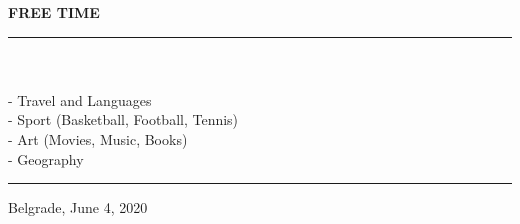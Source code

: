 \documentclass{article}
\begin{document}
\color{my_col}
\textbf{\large FREE TIME }\\
\noindent\rule{15.4cm}{1.6pt}\color{black}\\\\
- Travel and Languages\\
- Sport (Basketball, Football, Tennis) \\
- Art (Movies, Music, Books)\\
- Geography\\

\color{my_col}\noindent\rule{15.4cm}{1.6pt}\color{black}
\begin{flushright}
	\small Belgrade, June 4, 2020
\end{flushright}
\end{document}
